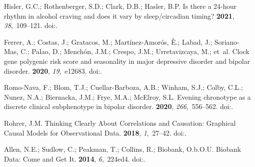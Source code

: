 \documentclass[genes,article,accept,moreauthors,pdftex]{Definitions/mdpi}
\begin{document}
\begin{thebibliography}{999}
Hisler, G.C.; Rothenberger, S.D.; Clark, D.B.; Hasler, B.P.
\newblock Is there a 24-hour rhythm in alcohol craving and does it vary by
  sleep/circadian timing?
 {\bf 2021}, {\em 38},~109--121.
\newblock
  doi:{\href{https://doi.org/10.1080/07420528.2020.1838532}{}}.

Ferrer, A.; Costas, J.; Gratacos, M.; Martínez-Amorós, È.; Labad, J.;
  Soriano-Mas, C.; Palao, D.; Menchón, J.M.; Crespo, J.M.; Urretavizcaya, M.;
  et~al.
\newblock Clock gene polygenic risk score and seasonality in major depressive
  disorder and bipolar disorder.
 {\bf 2020}, {\em 19},~e12683.
\newblock
  doi:{\href{https://doi.org/10.1111/gbb.12683}{}}.

Romo-Nava, F.; Blom, T.J.; Cuellar-Barboza, A.B.; Winham, S.J.; Colby, C.L.;
  Nunez, N.A.; Biernacka, J.M.; Frye, M.A.; McElroy, S.L.
\newblock Evening chronotype as a discrete clinical subphenotype in bipolar
  disorder.
 {\bf 2020}, {\em 266},~556--562.
\newblock
  doi:{\href{https://doi.org/10.1016/j.jad.2020.01.151}{}}.

Rohrer, J.M.
\newblock Thinking {Clearly} {About} {Correlations} and {Causation}:
  {Graphical} {Causal} {Models} for {Observational} {Data}.
 {\bf
  2018}, {\em 1},~27--42.
\newblock 
  doi:{\href{https://doi.org/10.1177/2515245917745629}{}}.

Allen, N.E.; Sudlow, C.; Peakman, T.; Collins, R.; Biobank, O.b.O.U.
 {Biobank} {Data}: {Come} and {Get} {It}.
 {\bf 2014}, {\em
  6},~224ed4.
\newblock 
  doi:{\href{https://doi.org/10.1126/scitranslmed.3008601}{}}.


\end{thebibliography}
\end{document}
